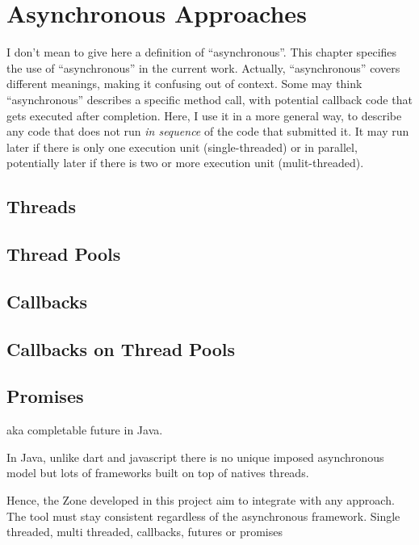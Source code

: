
\chapter{Asynchronous Approaches}
\label{ch:asyncworld}

I don't mean to give here a definition of ``asynchronous''.
This chapter specifies the use of ``asynchronous'' in the current work. Actually, ``asynchronous'' covers different meanings, making it confusing out of context.
Some may think ``asynchronous'' describes a specific method call, with potential callback code that gets executed after completion. Here, I use it in a more general way, to describe any code that does not run \emph{in sequence} of the code that submitted it. It may run later if there is only one execution unit (single-threaded) or in parallel, potentially later if there is two or more execution unit (mulit-threaded).


\section{Threads}

\section{Thread Pools}

\section{Callbacks}

\section{Callbacks on Thread Pools}

\section{Promises}
aka completable future in Java.


In Java, unlike dart and javascript there is no unique imposed asynchronous model but lots of frameworks built on top of natives threads.

Hence, the Zone developed in this project aim to integrate with any approach. The tool must stay consistent regardless of the asynchronous framework. Single threaded, multi threaded, callbacks, futures or promises
